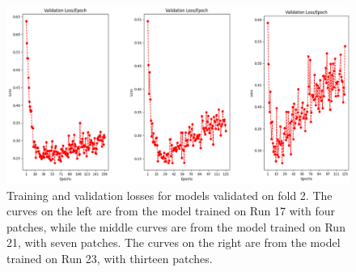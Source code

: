 \begin{figure}[!ht]
	\centering
	\includegraphics[width=1.0\linewidth]{figures/ValidationLossesFourSevenThirteenPatches.png}
	\caption{Training and validation losses for models validated on fold 2. The curves on the left are from the model trained on Run 17 with four patches, while the middle curves are from the model trained on Run 21, with seven patches. The curves on the right are from the model trained on Run 23, with thirteen patches.}
	\label{fig:ValidationLossesFourSevenThirteenPatches}
\end{figure}

